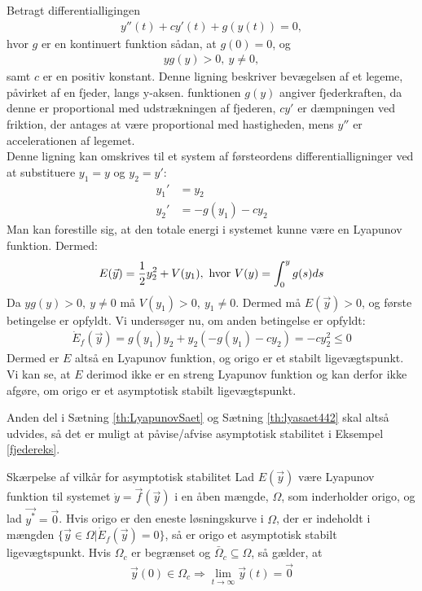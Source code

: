 \begin{Example}\label{fjedereks}
\textnormal{Betragt differentialligingen}
\begin{align*}
    y''(t)+cy'(t)+g(y(t))=0,
\end{align*}
\textnormal{hvor $g$ er en kontinuert funktion sådan, at $g(0)=0$, og}
\begin{align*}
    yg(y)>0, \ y\neq 0,
\end{align*}
\textnormal{samt $c$ er en positiv konstant. Denne ligning beskriver bevægelsen af et legeme, påvirket af en fjeder, langs y-aksen. funktionen $g(y)$ angiver fjederkraften, da denne er proportional med udstrækningen af fjederen, $cy'$ er dæmpningen ved friktion, der antages at være proportional med hastigheden, mens $y''$ er accelerationen af legemet.\\ \hfill \break
Denne ligning kan omskrives til et system af førsteordens differentialligninger ved at substituere $y_1=y$ og $y_2=y'$:}
\begin{align*}
    y_1'&=y_2\\
    y_2'&=-g(y_1)-cy_2
\end{align*}
\textnormal{Man kan forestille sig, at den totale energi i systemet kunne være en Lyapunov funktion. Dermed:}
\begin{align*}
    E(\vec{y})=\frac{1}{2}y_2^2+V(y_1), \ \textnormal{hvor}\ V(y)=\int_0^yg(s)ds
\end{align*}
\textnormal{Da $yg(y)>0, \ y\neq 0$ må $V(y_1)>0, \ y_1 \neq 0$. Dermed må $E(\vec{y})>0$, og første betingelse er opfyldt. Vi undersøger nu, om anden betingelse er opfyldt:}
\begin{align*}
    \dot{E}_f(\vec{y})=g(y_1)y_2+y_2(-g(y_1)-cy_2)=-cy_2^2\leq 0
\end{align*}
\textnormal{Dermed er $E$ altså en Lyapunov funktion, og origo er et stabilt ligevægtspunkt. Vi kan se, at $E$ derimod ikke er en streng Lyapunov funktion og kan derfor ikke afgøre, om origo er et asymptotisk stabilt ligevægtspunkt.}
\end{Example}
Anden del i Sætning \ref{th:LyapunovSaet} og Sætning \ref{th:lyasaet442} skal altså udvides, så det er muligt at påvise/afvise asymptotisk stabilitet i Eksempel \ref{fjedereks}.
\begin{mytheo}{Skærpelse af vilkår for asymptotisk stabilitet}{}
Lad $E(\vec{y})$ være Lyapunov funktion til systemet $\dot{y}=\vec{f}(\vec{y})$ i en åben mængde, $\Omega$, som inderholder origo, og lad $\vec{y^*}=\vec{0}$. Hvis origo er den eneste løsningskurve i $\Omega$, der er indeholdt i mængden $\{\vec{y}\in \Omega | \dot{E}_f(\vec{y})=0\}$, så er origo et asymptotisk stabilt ligevægtspunkt. Hvis $\Omega_c$ er begrænset og $\bar{\Omega}_c\subseteq \Omega$, så gælder, at
\begin{align*}
    \vec{y}(0)\in \Omega_c \Rightarrow \lim_{t \to \infty} \vec{y}(t)= \vec{0}
\end{align*}
\end{mytheo}

